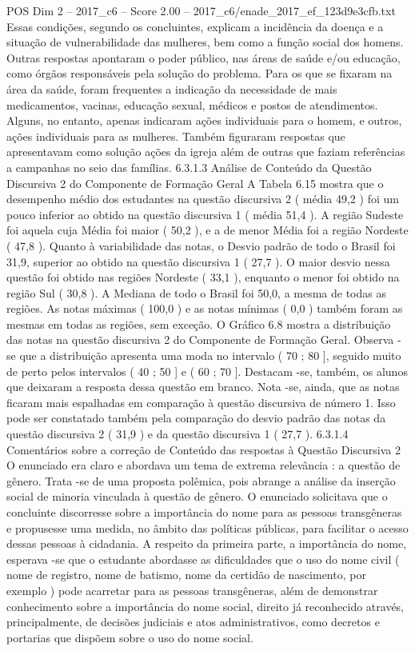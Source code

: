 \begin{textsample}{POS Dim 2 – 2017\_c6 – Score 2.00 – 2017\_c6/enade\_2017\_ef\_123d9e3cfb.txt}
Essas condições, segundo os concluintes, explicam a incidência da doença e a situação de vulnerabilidade das mulheres, bem como a função social dos homens.
Outras respostas apontaram o poder público, nas áreas de saúde e/ou educação, como órgãos responsáveis pela solução do problema.
Para os que se fixaram na área da saúde, foram frequentes a indicação da necessidade de mais medicamentos, vacinas, educação sexual, médicos e postos de atendimentos.
Alguns, no entanto, apenas indicaram ações individuais para o homem, e outros, ações individuais para as mulheres.
Também figuraram respostas que apresentavam como solução ações da igreja além de outras que faziam referências a campanhas no seio das famílias. 6.3.1.3 Análise de Conteúdo da Questão Discursiva 2 do Componente de Formação Geral A Tabela 6.15 mostra que o desempenho médio dos estudantes na questão discursiva 2 ( média 49,2 ) foi um pouco inferior ao obtido na questão discursiva 1 ( média 51,4 ).
A região Sudeste foi aquela cuja Média foi maior ( 50,2 ), e a de menor Média foi a região Nordeste ( 47,8 ).
Quanto à variabilidade das notas, o Desvio padrão de todo o Brasil foi 31,9, superior ao obtido na questão discursiva 1 ( 27,7 ).
O maior desvio nessa questão foi obtido nas regiões Nordeste ( 33,1 ), enquanto o menor foi obtido na região Sul ( 30,8 ).
A Mediana de todo o Brasil foi 50,0, a mesma de todas as regiões.
As notas máximas ( 100,0 ) e as notas mínimas ( 0,0 ) também foram as mesmas em todas as regiões, sem exceção.
O Gráfico 6.8 mostra a distribuição das notas na questão discursiva 2 do Componente de Formação Geral.
Observa -se que a distribuição apresenta uma moda no intervalo ( 70 ; 80 ], seguido muito de perto pelos intervalos ( 40 ; 50 ] e ( 60 ; 70 ].
Destacam -se, também, os alunos que deixaram a resposta dessa questão em branco.
Nota -se, ainda, que as notas ficaram mais espalhadas em comparação à questão discursiva de número 1.
Isso pode ser constatado também pela comparação do desvio padrão das notas da questão discursiva 2 ( 31,9 ) e da questão discursiva 1 ( 27,7 ). 6.3.1.4 Comentários sobre a correção de Conteúdo das respostas à Questão Discursiva 2 O enunciado era claro e abordava um tema de extrema relevância : a questão de gênero.
Trata -se de uma proposta polêmica, pois abrange a análise da inserção social de minoria vinculada à questão de gênero.
O enunciado solicitava que o concluinte discorresse sobre a importância do nome para as pessoas transgêneras e propusesse uma medida, no âmbito das políticas públicas, para facilitar o acesso dessas pessoas à cidadania.
A respeito da primeira parte, a importância do nome, esperava -se que o estudante abordasse as dificuldades que o uso do nome civil ( nome de registro, nome de batismo, nome da certidão de nascimento, por exemplo ) pode acarretar para as pessoas transgêneras, além de demonstrar conhecimento sobre a importância do nome social, direito já reconhecido através, principalmente, de decisões judiciais e atos administrativos, como decretos e portarias que dispõem sobre o uso do nome social.

\end{textsample}
